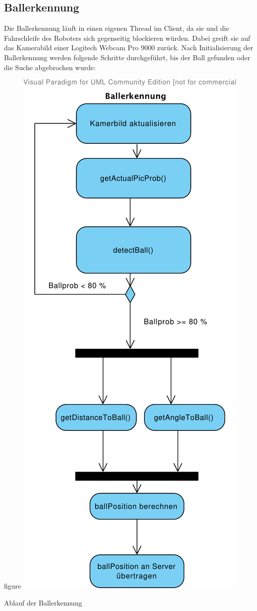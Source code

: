 \subsection{Ballerkennung}

\label{sec:balldetection}
Die Ballerkennung läuft in einen eigenen Thread im Client, da sie und
die Fahrschleife des Roboters sich gegenseitig blockieren
würden. Dabei greift sie auf das Kamerabild einer Logitech Webcam Pro 9000
zurück. Nach Initialisierung der Ballerkennung
werden folgende Schritte durchgeführt, bis der Ball gefunden oder die
Suche abgebrochen wurde:
\begin{nofloat}{figure}
\centering
\includegraphics[width=0.5\linewidth]{bilder/balldetect_uml}
  \caption{Ablauf der Ballerkennung}
\end{nofloat}
